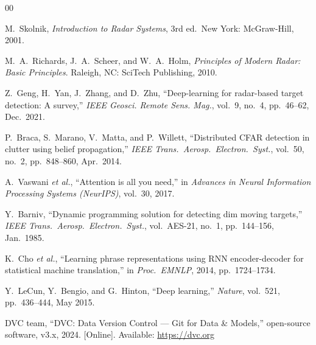 \documentclass[conference]{IEEEtran}
\begin{document}
\begin{thebibliography}{00}

M.\ Skolnik, \textit{Introduction to Radar Systems}, 3rd ed.\
New York: McGraw-Hill, 2001.

M.\ A.\ Richards, J.\ A.\ Scheer, and W.\ A.\ Holm,
\textit{Principles of Modern Radar: Basic Principles}.
Raleigh, NC: SciTech Publishing, 2010.

Z.\ Geng, H.\ Yan, J.\ Zhang, and D.\ Zhu,
``Deep-learning for radar-based target detection: A survey,''
\textit{IEEE Geosci. Remote Sens. Mag.}, vol.\ 9, no.\ 4,
pp.\ 46--62, Dec.\ 2021.

P.\ Braca, S.\ Marano, V.\ Matta, and P.\ Willett,
``Distributed CFAR detection in clutter using belief propagation,''
\textit{IEEE Trans.\ Aerosp.\ Electron.\ Syst.}, vol.\ 50, no.\ 2,
pp.\ 848--860, Apr.\ 2014.

A.\ Vaswani \textit{et al.},
``Attention is all you need,''
in \textit{Advances in Neural Information Processing Systems (NeurIPS)},
vol.\ 30, 2017.

Y.\ Barniv,
``Dynamic programming solution for detecting dim moving targets,''
\textit{IEEE Trans.\ Aerosp.\ Electron.\ Syst.}, vol.\ AES-21, no.\ 1,
pp.\ 144--156, Jan.\ 1985.

K.\ Cho \textit{et al.},
``Learning phrase representations using RNN encoder-decoder for
statistical machine translation,''
in \textit{Proc.\ EMNLP}, 2014, pp.\ 1724--1734.

Y.\ LeCun, Y.\ Bengio, and G.\ Hinton,
``Deep learning,''
\textit{Nature}, vol.\ 521, pp.\ 436--444, May 2015.

DVC team, ``DVC: Data Version Control --- Git for Data \& Models,''
open-source software, v3.x, 2024.
[Online]. Available: \url{https://dvc.org}

\end{thebibliography}
\end{document}
